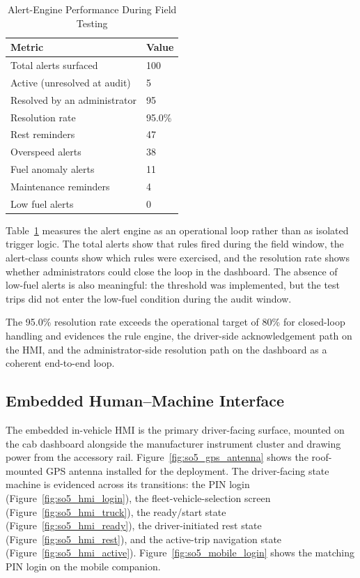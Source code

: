 \begin{table}[!htbp]
\centering
\caption{Alert-Engine Performance During Field Testing}
\label{tab:so5_alert_perf}
\scriptsize
\begin{tabular}{|p{}|p{}|}
\hline
\textbf{Metric} & \textbf{Value} \\
\hline
Total alerts surfaced & 100 \\
\hline
Active (unresolved at audit) & 5 \\
\hline
Resolved by an administrator & 95 \\
\hline
Resolution rate & 95.0\% \\
\hline
Rest reminders & 47 \\
\hline
Overspeed alerts & 38 \\
\hline
Fuel anomaly alerts & 11 \\
\hline
Maintenance reminders & 4 \\
\hline
Low fuel alerts & 0 \\
\hline
\end{tabular}
\normalsize
\end{table}

Table~\ref{tab:so5_alert_perf} measures the alert engine as an operational loop rather than as isolated trigger logic. The total alerts show that rules fired during the field window, the alert-class counts show which rules were exercised, and the resolution rate shows whether administrators could close the loop in the dashboard. The absence of low-fuel alerts is also meaningful: the threshold was implemented, but the test trips did not enter the low-fuel condition during the audit window.

The 95.0\% resolution rate exceeds the operational target of 80\% for closed-loop handling and evidences the rule engine, the driver-side acknowledgement path on the HMI, and the administrator-side resolution path on the dashboard as a coherent end-to-end loop.

\subsection{Embedded Human--Machine Interface}
The embedded in-vehicle HMI is the primary driver-facing surface, mounted on the cab dashboard alongside the manufacturer instrument cluster and drawing power from the accessory rail. Figure~\ref{fig:so5_gps_antenna} shows the roof-mounted GPS antenna installed for the deployment. The driver-facing state machine is evidenced across its transitions: the PIN login (Figure~\ref{fig:so5_hmi_login}), the fleet-vehicle-selection screen (Figure~\ref{fig:so5_hmi_truck}), the ready/start state (Figure~\ref{fig:so5_hmi_ready}), the driver-initiated rest state (Figure~\ref{fig:so5_hmi_rest}), and the active-trip navigation state (Figure~\ref{fig:so5_hmi_active}). Figure~\ref{fig:so5_mobile_login} shows the matching PIN login on the mobile companion.

